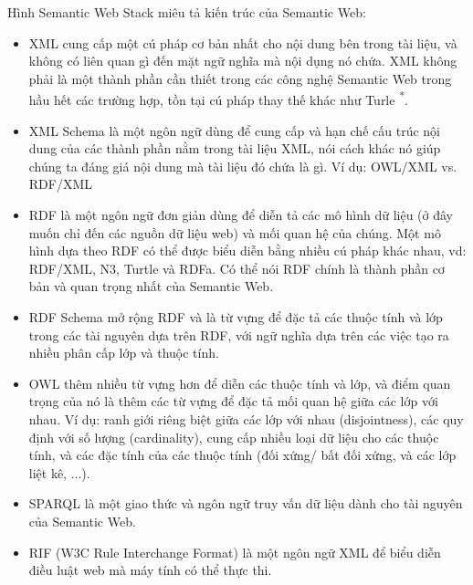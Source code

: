 Hình Semantic Web Stack\cite{semantic3} miêu tả kiến trúc của Semantic Web:

\begin{itemize}
\item XML cung cấp một cú pháp cơ bản nhất cho nội dung bên trong tài liệu, và không có liên quan gì đến mặt ngữ nghĩa mà nội dụng nó chứa. XML không phải là một thành phần cần thiết trong các công nghệ Semantic Web trong hầu hết các trường hợp, tồn tại cú pháp thay thế khác như Turle \textsuperscript{*}. 

\item XML Schema là một ngôn ngữ dùng để cung cấp và hạn chế cấu trúc nội dung của các thành phần nằm trong tài liệu XML, nói cách khác nó giúp chúng ta đáng giá nội dung mà tài liệu đó chứa là gì. Ví dụ: OWL/XML vs. RDF/XML

\item RDF \cite{rdf} là một ngôn ngữ đơn giản dùng để diễn tả các mô hình dữ liệu (ở đây muốn chỉ đến các nguồn dữ liệu web) và mối quan hệ của chúng. Một mô hình dựa theo RDF có thể được biểu diễn bằng nhiều cú pháp khác nhau, vd: RDF/XML, N3, Turtle và RDFa. Có thể nói RDF chính là thành phần cơ bản và quan trọng nhất của Semantic Web.

\item RDF Schema \cite{rdfs} mở rộng RDF và là từ vựng để đặc tả các thuộc tính và lớp trong các tài nguyên dựa trên RDF, với ngữ nghĩa dựa trên các việc tạo ra nhiều phân cấp lớp và thuộc tính.
\item OWL thêm nhiều từ vựng hơn để diễn các thuộc tính và lớp, và điểm quan trọng của nó là thêm các từ vựng để đặc tả mối quan hệ giữa các lớp với nhau. Ví dụ: ranh giới riêng biệt giữa các lớp với nhau (disjointness), các quy định với số lượng (cardinality), cung cấp nhiều loại dữ liệu cho các thuộc tính, và các đặc tính của các thuộc tính (đối xứng/ bất đối xứng, và các lớp liệt kê, ...).

\item SPARQL là một giao thức và ngôn ngữ truy vấn dữ liệu dành cho tài nguyên của Semantic Web.

\item RIF (W3C Rule Interchange Format) là một ngôn ngữ XML để biểu diễn điều luật web mà máy tính có thể thực thi.

\end{itemize}
{\let\thefootnote\relax{}
}
